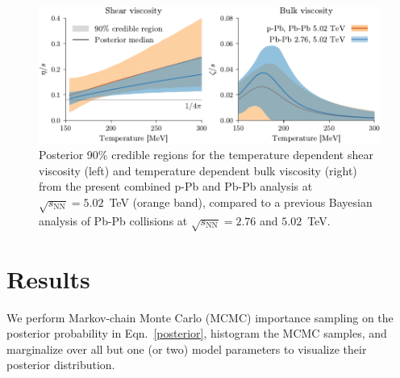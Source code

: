 \documentclass[3p,times,procedia]{elsarticle}
\newcommand{\sqrts}{\sqrt{s_\mathrm{NN}}}
\begin{document}
\begin{figure}
  \includegraphics[width=\textwidth]{region_shear_bulk}
  \caption{Posterior 90\% credible regions for the temperature dependent shear viscosity (left) and temperature dependent bulk viscosity (right) from the present combined p-Pb and Pb-Pb analysis at $\sqrts=5.02$~TeV (orange band), compared to a previous Bayesian analysis of Pb-Pb collisions at $\sqrts=2.76$ and $5.02$~TeV.}
\end{figure}

\section{Results}

We perform Markov-chain Monte Carlo (MCMC) importance sampling on the posterior probability in Eqn.~\eqref{posterior}, histogram the MCMC samples, and marginalize over all but one (or two) model parameters to visualize their posterior distribution.








%
%
%
\end{document}
